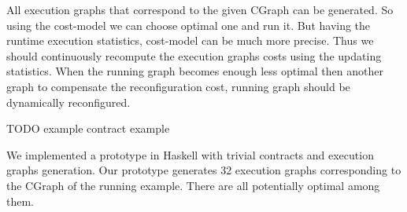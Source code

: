 All execution graphs that correspond to the given CGraph can be generated.
So using the cost-model we can choose optimal one and run it.
But having the runtime execution statistics, cost-model can be much more precise.
Thus we should continuously recompute the execution graphs costs using the updating statistics.
When the running graph becomes enough less optimal then another graph to compensate the reconfiguration cost, running graph should be dynamically reconfigured.

TODO example contract example

We implemented a prototype in Haskell with trivial contracts and execution graphs generation.
Our prototype generates 32 execution graphs corresponding to the CGraph of the running example.
There are all potentially optimal among them.







